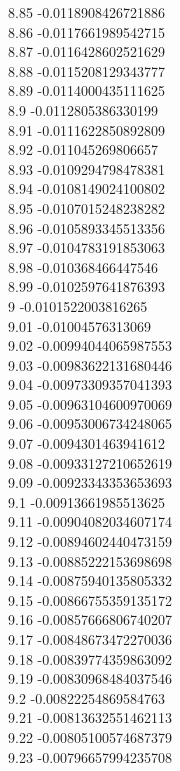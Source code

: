 {8.85	-0.0118908426721886\\
8.86	-0.0117661989542715\\
8.87	-0.0116428602521629\\
8.88	-0.0115208129343777\\
8.89	-0.0114000435111625\\
8.9	-0.0112805386330199\\
8.91	-0.0111622850892809\\
8.92	-0.011045269806657\\
8.93	-0.0109294798478381\\
8.94	-0.0108149024100802\\
8.95	-0.0107015248238282\\
8.96	-0.0105893345513356\\
8.97	-0.0104783191853063\\
8.98	-0.010368466447546\\
8.99	-0.0102597641876393\\
9	-0.0101522003816265\\
9.01	-0.01004576313069\\
9.02	-0.00994044065987553\\
9.03	-0.00983622131680446\\
9.04	-0.00973309357041393\\
9.05	-0.00963104600970069\\
9.06	-0.00953006734248065\\
9.07	-0.0094301463941612\\
9.08	-0.00933127210652619\\
9.09	-0.00923343353653693\\
9.1	-0.00913661985513625\\
9.11	-0.00904082034607174\\
9.12	-0.00894602440473159\\
9.13	-0.00885222153698698\\
9.14	-0.00875940135805332\\
9.15	-0.00866755359135172\\
9.16	-0.00857666806740207\\
9.17	-0.00848673472270036\\
9.18	-0.00839774359863092\\
9.19	-0.00830968484037546\\
9.2	-0.00822254869584763\\
9.21	-0.00813632551462113\\
9.22	-0.00805100574687379\\
9.23	-0.00796657994235708\\
}
